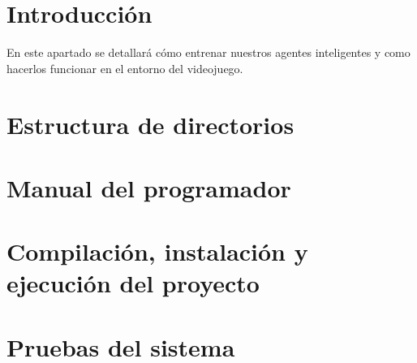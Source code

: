 
\section{Introducción}
En este apartado se detallará cómo entrenar nuestros agentes inteligentes y como hacerlos funcionar en el entorno del videojuego. 

\section{Estructura de directorios}


\section{Manual del programador}

\section{Compilación, instalación y ejecución del proyecto}

\section{Pruebas del sistema}
